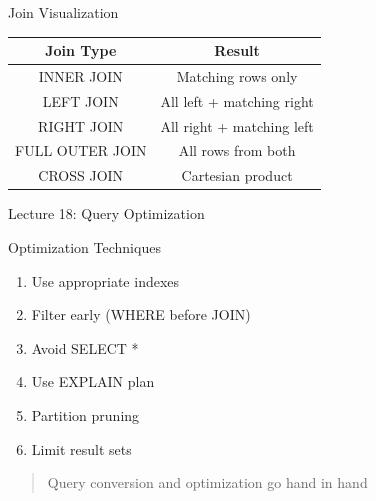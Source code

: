 \documentclass{beamer}
\begin{document}
	\begin{frame}{Join Visualization}
		\begin{center}
			\begin{tabular}{|c|c|}
				\hline
				\textbf{Join Type} & \textbf{Result} \\
				\hline
				INNER JOIN & Matching rows only \\
				\hline
				LEFT JOIN & All left + matching right \\
				\hline
				RIGHT JOIN & All right + matching left \\
				\hline
				FULL OUTER JOIN & All rows from both \\
				\hline
				CROSS JOIN & Cartesian product \\
				\hline
			\end{tabular}
		\end{center}
	\end{frame}
	
	\begin{frame}{Lecture 18: Query Optimization}
		\begin{block}{Optimization Techniques}
			\begin{enumerate}
				\item Use appropriate indexes
				\item Filter early (WHERE before JOIN)
				\item Avoid SELECT *
				\item Use EXPLAIN plan
				\item Partition pruning
				\item Limit result sets
			\end{enumerate}
		\end{block}
		\begin{quote}
			Query conversion and optimization go hand in hand
		\end{quote}
	\end{frame}
	
	
	
	
	
\end{document}
